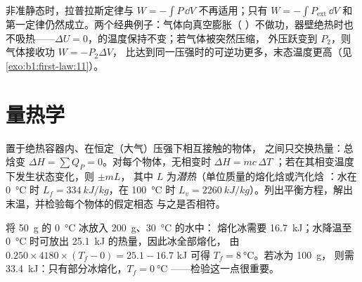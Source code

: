 \begin{remark}[不可逆过程]\label{rem:b1:first-law:irreversible}
非准静态时，拉普拉斯定律与 $W =
-\int P\,\dd V$ 不再适用；只有 $W = -\int P_{\mathrm{ext}}\,\dd V$ 和
第一定律仍然成立。两个经典例子：气体向真空膨胀（
）不做功，器壁绝热时也不吸热——$\Delta U
= 0$，的温度保持不变；若气体被突然压缩，
外压跃变到 $P_2$，则气体接收功 $W = -P_2\Delta V$，
比达到同一压强时的可逆功更多，末态温度更高（见
\cref{exo:b1:first-law:11}）。
\end{remark}

\section{量热学}

\begin{method}[量热平衡]\label{met:b1:first-law:calorimetry}
置于绝热容器内、在恒定（大气）压强下相互接触的物体，
之间只交换热量：总焓变
$\Delta H = \sum Q_P = 0$。对每个物体，无相变时 $\Delta H = mc\,\Delta T$
；若在其相变温度下发生状态变化，则 $\pm mL$，
其中 $L$ 为\emph{潜热}（单位质量的熔化焓或汽化焓
：水在 \qty{0}{\degreeCelsius} 时 $L_f = \qty{334}{kJ/kg}$，在 \qty{100}{\degreeCelsius} 时 $L_v =
\qty{2260}{kJ/kg}$）。列出平衡方程，解出
末温，并检验每个物体的假定相态
与之是否相符。
\end{method}

\begin{example}[冰入水中]\label{ex:b1:first-law:ice}
将 \qty{50}{g} 的 \qty{0}{\degreeCelsius} 冰放入 \qty{200}{g}、\qty{30}{\degreeCelsius} 的水中：
熔化冰需要 \qty{16.7}{kJ}；水降温至 \qty{0}{\degreeCelsius} 时可放出
\qty{25.1}{kJ} 的热量，因此冰全部熔化，
由 $0.250 \times 4180 \times (T_f - 0) = 25.1 - 16.7$ kJ 可得
$T_f = \qty{8}{\degreeCelsius}$。若冰为 \qty{100}{g}，
则需 \qty{33.4}{kJ}：只有部分冰熔化，$T_f = \qty{0}{\degreeCelsius}$
——检验这一点很重要。
\end{example}

